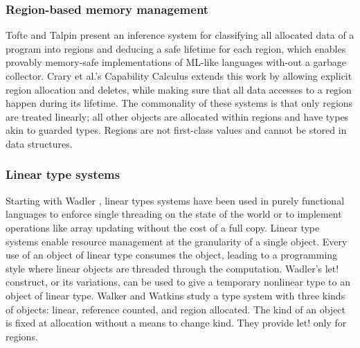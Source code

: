 
\subsubsection{Region-based memory management}
Tofte and Talpin \cite{8_7} present an inference system for classifying all allocated data of a program into regions and deducing a safe lifetime for each region, which enables provably memory-safe implementations of ML-like languages with-out a garbage collector. Crary et al.'s Capability Calculus \cite{8_6} extends this work by allowing explicit region allocation and deletes, while making sure that all data accesses to a region happen during its lifetime. The commonality of these systems is that only regions are treated linearly; all other objects are allocated within regions and have types akin to guarded types. Regions are not first-class values and cannot be stored in data structures.

\subsubsection{Linear type systems}
Starting with Wadler \cite{8_5}, linear types systems have been used in purely functional languages to enforce single threading on the state of the world or to implement operations like array updating without the cost of a full copy. Linear type systems enable resource management at the granularity of a single object. Every use of an object of linear type consumes the object, leading to a programming style where linear objects are threaded through the computation. Wadler's let! construct, or its variations, can be used to give a temporary nonlinear type to an object of linear type. Walker and Watkins \cite{8_8} study a type system with three kinds of objects: linear, reference counted, and region allocated. The kind of an object is fixed at allocation without a means to change kind. They provide let! only for regions.

